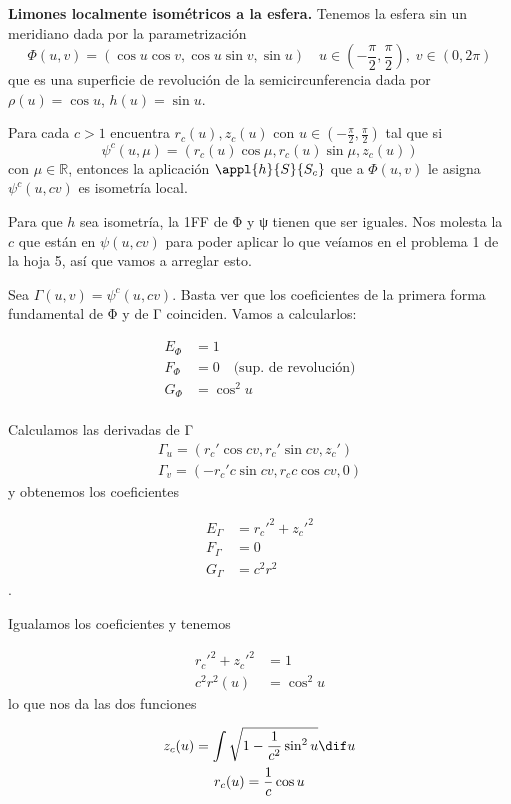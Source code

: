 \begin{problem}[6] \textbf{Limones localmente isométricos a la esfera.} Tenemos la esfera sin un meridiano dada por la parametrización
\[
Φ(u,v) = (\cos u\cos v,\cos u \sin v, \sin u)\quad u∈\left(-\frac{π}{2},\frac{π}{2}\right),\;v∈(0,2π) 
\]
que es una superficie de revolución de la semicircunferencia dada por $ρ(u) = \cos u$, $h(u) = \sin u$.

\ppart Para cada $c>1$ encuentra $r_c(u), z_c(u)$ con $u∈\left(-\frac{π}{2},\frac{π}{2}\right)$ tal que si \[ ψ^c(u,μ) = \left(r_c(u)\cos μ, r_c(u)\sin μ, z_c(u)\right) \] con $μ∈ℝ$, entonces la aplicación $\appl{h}{S}{S_c}$ que a $Φ(u,v)$ le asigna $ψ^c(u,cv)$ es isometría local.

\solution

Para que $h$ sea isometría, la 1FF de Φ y ψ tienen que ser iguales. Nos molesta la $c$ que están en $ψ(u,cv)$ para poder aplicar lo que veíamos en el problema 1 de la hoja 5, así que vamos a arreglar esto.

Sea $ Γ(u,v) = ψ^c(u,cv)$. Basta ver que los coeficientes de la primera forma fundamental de Φ y de Γ coinciden. Vamos a calcularlos:

\begin{align*}
E_Φ &= 1\\
F_Φ &= 0\quad \text{(sup. de revolución)} \\
G_Φ &= \cos^2 u \\
\end{align*}

Calculamos las derivadas de Γ
\begin{gather*}
Γ_u = (r_c' \cos cv,r_c'\sin cv,z_c') \\
Γ_v = (-r_c'c\sin cv, r_c c \cos cv, 0) 
\end{gather*}
y obtenemos los coeficientes

\begin{align*}
E_Γ &= r_c'^2 + z_c'^2 \\
F_Γ &= 0 \\
G_Γ &= c^2r^2
\end{align*}.

Igualamos los coeficientes y tenemos

\begin{align*}
r_c'^2 + z_c'^2 &= 1 \\
c^2r^2(u) &= \cos^2 u
\end{align*} lo que nos da las dos funciones

\begin{gather*}
z_c(u) = \int\sqrt{1-\frac{1}{c^2}\sin^2u}\dif u \\
r_c(u) = \frac{1}{c}\cos u
\end{gather*} 


\end{problem}
